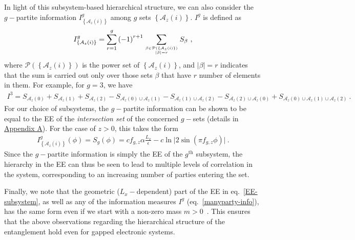 In light of this subsystem-based hierarchical structure, we can also consider the \(g-\)partite information \(I^g_{\left\{ \mathcal{A}_{z}(i) \right\}} \) among \(g\) sets \(\left\{\mathcal{A}_{z}(i)\right\}\). $I^g$ is defined as~\cite{siddhartha_TEE}
\begin{equation}\begin{aligned}
	\label{Ig_def}
	I^g_{\left\{ \mathcal{A}_{z}(i) \right\}} = \sum_{r=1}^g \left( -1 \right)^{r+1} \sum_{\beta \in \mathcal{P}\left(\left\{ \mathcal{A}_{z}(i) \right\}\right)\atop{|\beta|=r}} S_\beta~,
\end{aligned}\end{equation}
where \(\mathcal{P}\left(\left\{ \mathcal{A}_{z}(i) \right\}\right)\) is the power set of \(\left\{ \mathcal{A}_{z}(i) \right\}\), and \(|\beta|=r\) indicates that the sum is carried out only over those sets \(\beta\) that have \(r\) number of elements in them. For example, for \(g=3\), we have
\begin{equation}\begin{aligned}
	I^3 = S_{\mathcal{A}_{z}(0)} + S_{\mathcal{A}_{z}(1)} + S_{\mathcal{A}_{z}(2)} - S_{\mathcal{A}_{z}(0)\cup \mathcal{A}_{z}(1)} - S_{\mathcal{A}_{z}(1)\cup \mathcal{A}_{z}(2)} - S_{\mathcal{A}_{z}(2)\cup \mathcal{A}_{z}(0)} + S_{\mathcal{A}_{z}(0)\cup \mathcal{A}_{z}(1) \cup \mathcal{A}_{z}(2)}~.
\end{aligned}\end{equation}
For our choice of subsystems, the \(g-\)partite information can be shown to be equal to the EE of the {\it intersection set} of the concerned \(g-\)sets (details in \hyperref[g-partite info]{Appendix A}). For the case of \(z > 0\), this takes the form
\begin{equation}\begin{aligned}
	\label{manyparty-info}
	I^g_{\left\{ \mathcal{A}_{z}(i) \right\}}(\phi) = S_{g}(\phi) = c f_{g,z}\alpha \frac{L_x}{\epsilon} - c\ln \big|2\sin\left(\pi f_{g,z} \phi\right) \big|~.
\end{aligned}\end{equation}
Since the \(g-\)partite information is simply the EE of the \(g^\text{th}\) subsystem, the hierarchy in the EE can thus be seen to lead to multiple levels of correlation in the system, corresponding to an increasing number of parties entering the set.

Finally, we note that the geometric (\(L_x-\)dependent) part of the EE in eq.~\eqref{EE-subsystem}, as well as any of the information measures $I^g$ (eq.~\eqref{manyparty-info}), has the same form even if we start with a non-zero mass \(m > 0\)~\cite{Chen_2017}. This ensures that the above observations regarding the hierarchical structure of the entanglement hold even for gapped electronic systems.

